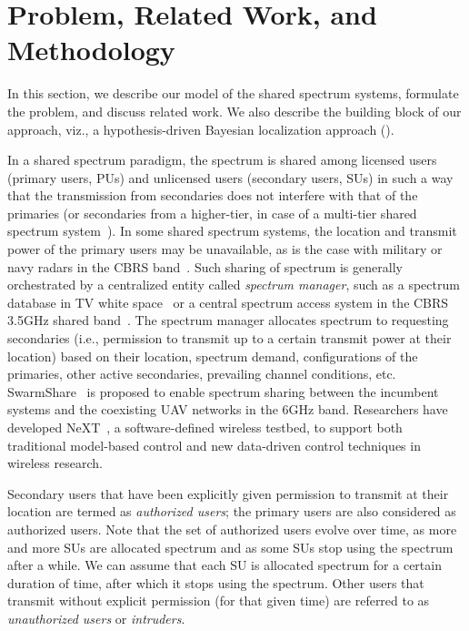 \section{Problem, Related Work, and Methodology}
\label{sec:ipsn-problem}

In this section, we describe our model of the shared spectrum systems,
formulate the \mtl problem, and discuss related work.  We also
describe the building block of our approach, viz., a hypothesis-driven
Bayesian localization approach (\map).

 In a shared spectrum paradigm, the
spectrum is shared among licensed users (primary users, PUs) and
unlicensed users (secondary users, SUs) in such a way that the
transmission from secondaries does not interfere with that of the
primaries (or secondaries from a higher-tier, in case of a multi-tier
shared spectrum system~\cite{scte-isbe16-cbrs}). In some shared spectrum systems,
the location and transmit power of the primary users may be
unavailable, as is the case with military or navy radars in the CBRS
band~\cite{scte-isbe16-cbrs}.
Such sharing of spectrum is generally orchestrated by a centralized
entity called {\em spectrum manager}, such as a spectrum
database in TV white
space~\cite{sas-paper} or a central spectrum access system in
the CBRS 3.5GHz shared band~\cite{milind2015dyspan}. The spectrum
manager allocates spectrum to requesting secondaries (i.e., permission
to transmit up to a certain transmit power at their location) based on
their location, spectrum demand, configurations of the primaries, other
active secondaries, prevailing channel conditions, etc.
SwarmShare~\cite{jiangqi2021spectrum,jiangqi2023spectrum} is proposed to enable spectrum sharing
between the incumbent systems and the coexisting UAV networks in the 6GHz band.
Researchers have developed NeXT~\cite{jiangqi2022next,jiangqi2023next}, a software-defined wireless testbed, 
to support both traditional model-based control and new data-driven control techniques in wireless research.

Secondary users that have been explicitly given permission to transmit
at their location are termed as {\em authorized users}; the primary
users are also considered as authorized users. Note that the set of
authorized users evolve over time, as more and more SUs are allocated
spectrum and as some SUs stop using the spectrum after a while. We can
assume that each SU is allocated spectrum for a certain duration of
time, after which it stops using the spectrum. 
Other users that transmit without explicit permission (for that given
time) are referred to as {\em unauthorized users} or {\em intruders}.


